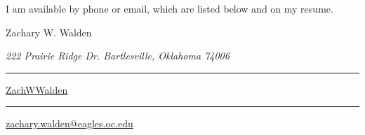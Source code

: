 \documentclass{article}
\newcommand\mybar{\kern1pt\rule[-\dp\strutbox]{.8pt}{\baselineskip}\kern1pt}
\begin{document}
\begin{adjustwidth}{70pt}{70pt}
\begin{spacing}{1.25}
I am available by phone or email, which are listed below and on my resume.

\vspace*{\fill}
\end{spacing}
\end{adjustwidth}

\newpage


\begin{center}
	\begin{Huge}
		Zachary W. Walden\\
	\end{Huge}
	\begin{large}
		\textsl{222 Prairie Ridge Dr. Bartlesville, Oklahoma 74006}\\
	\end{large}
	\begin{normalsize}
		 \mybar { } \faGithub \href{https://github.com/ZachWWalden}{ ZachWWalden}
		\mybar { }\faEnvelope\href{mailto::zachary.walden@eagles.oc.edu}{ zachary.walden@eagles.oc.edu}
	\end{normalsize}
\end{center}
\end{document}
